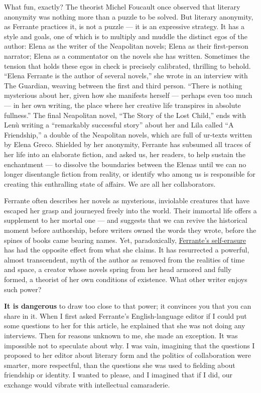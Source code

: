 What fun, exactly? The theorist Michel Foucault once observed that
literary anonymity was nothing more than a puzzle to be solved. But
literary anonymity, as Ferrante practices it, is not a puzzle --- it is
an expressive strategy. It has a style and goals, one of which is to
multiply and muddle the distinct egos of the author: Elena as the writer
of the Neapolitan novels; Elena as their first-person narrator; Elena as
a commentator on the novels she has written. Sometimes the tension that
holds these egos in check is precisely calibrated, thrilling to behold.
``Elena Ferrante is the author of several novels,'' she wrote in an
interview with The Guardian, weaving between the first and third person.
``There is nothing mysterious about her, given how she manifests herself
--- perhaps even too much --- in her own writing, the place where her
creative life transpires in absolute fullness.'' The final Neapolitan
novel, ``The Story of the Lost Child,'' ends with Lenù writing a
``remarkably successful story'' about her and Lila called ``A
Friendship,'' a double of the Neapolitan novels, which are full of
ur-texts written by Elena Greco. Shielded by her anonymity, Ferrante has
subsumed all traces of her life into an elaborate fiction, and asked us,
her readers, to help sustain the enchantment --- to dissolve the
boundaries between the Elenas until we can no longer disentangle fiction
from reality, or identify who among us is responsible for creating this
enthralling state of affairs. We are all her collaborators.

Ferrante often describes her novels as mysterious, inviolable creatures
that have escaped her grasp and journeyed freely into the world. Their
immortal life offers a supplement to her mortal one --- and suggests
that we can revive the historical moment before authorship, before
writers owned the words they wrote, before the spines of books came
bearing names. Yet, paradoxically,
\href{https://www.nytimes3xbfgragh.onion/2016/10/03/books/elena-ferrante-anita-raja-domenico-starnone.html}{Ferrante's
self-erasure} has had the opposite effect from what she claims. It has
resurrected a powerful, almost transcendent, myth of the author as
removed from the realities of time and space, a creator whose novels
spring from her head armored and fully formed, a theorist of her own
conditions of existence. What other writer enjoys such power?

\textbf{It is dangerous} to draw too close to that power; it convinces
you that you can share in it. When I first asked Ferrante's
English-language editor if I could put some questions to her for this
article, he explained that she was not doing any interviews. Then for
reasons unknown to me, she made an exception. It was impossible not to
speculate about why. I was vain, imagining that the questions I proposed
to her editor about literary form and the politics of collaboration were
smarter, more respectful, than the questions she was used to fielding
about friendship or identity. I wanted to please, and I imagined that if
I did, our exchange would vibrate with intellectual camaraderie.

